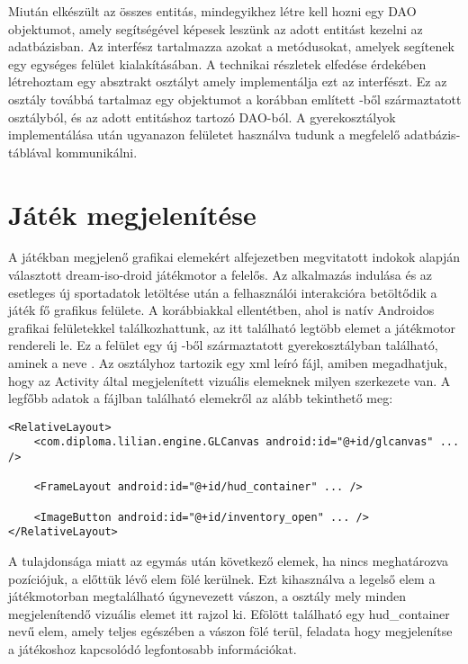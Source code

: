 Miután elkészült az összes entitás, mindegyikhez létre kell hozni egy DAO objektumot, amely segítségével képesek leszünk az adott entitást kezelni az adatbázisban. 
Az  interfész tartalmazza azokat a metódusokat, amelyek segítenek egy egységes felület kialakításában. 
A technikai részletek elfedése érdekében létrehoztam egy absztrakt  osztályt amely implementálja ezt az interfészt. 
Ez az osztály továbbá tartalmaz egy objektumot a korábban említett -ből származtatott osztályból, és az adott entitáshoz tartozó DAO-ból.
A gyerekosztályok implementálása után ugyanazon felületet használva tudunk a megfelelő adatbázis-táblával kommunikálni. 

\section{Játék megjelenítése}
\label{megjelenites}

A játékban megjelenő grafikai elemekért  alfejezetben megvitatott indokok alapján választott dream-iso-droid játékmotor a felelős. 
Az alkalmazás indulása és az esetleges új sportadatok letöltése után a felhasználói interakcióra betöltődik a játék fő grafikus felülete. 
A korábbiakkal ellentétben, ahol is natív Androidos grafikai felületekkel találkozhattunk, az itt található legtöbb elemet a játékmotor rendereli le. 
Ez a felület egy új -ből származtatott gyerekosztályban található, aminek a neve . 
Az osztályhoz tartozik egy xml leíró fájl, amiben megadhatjuk, hogy az Activity által megjelenített vizuális elemeknek milyen szerkezete van. 
A legfőbb adatok a fájlban található elemekről az alább tekinthető meg:

\begin{lstlisting}
<RelativeLayout>
    <com.diploma.lilian.engine.GLCanvas android:id="@+id/glcanvas" ... />

    <FrameLayout android:id="@+id/hud_container" ... />

    <ImageButton android:id="@+id/inventory_open" ... />
</RelativeLayout>
\end{lstlisting}

A  tulajdonsága miatt az egymás után következő elemek, ha nincs meghatározva pozíciójuk, a előttük lévő elem fölé kerülnek. 
Ezt kihasználva a legelső elem a játékmotorban megtalálható úgynevezett vászon, a  osztály mely minden megjelenítendő vizuális elemet itt rajzol ki. 
Efölött található egy hud\_container nevű elem, amely teljes egészében a vászon fölé terül, feladata hogy megjelenítse a játékoshoz kapcsolódó legfontosabb információkat.

